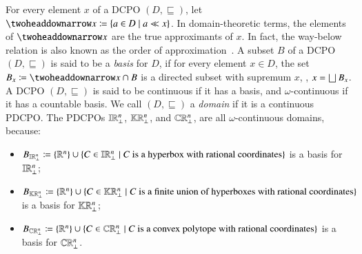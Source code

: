 \documentclass[11pt,times]{article}
\begin{document}
For every element $x$ of a \ac{DCPO} $(D, \sqsubseteq)$, let
$\waybelows{x} \defeq \setbarNormal{a \in D}{a \ll x}$. In
domain-theoretic terms, the elements of $\waybelows{x}$ are the true
approximants of $x$. In fact, the way-below relation is also known as
the order of
approximation~\parencite[Section~2.2.1]{AbramskyJung94-DT}. A subset
$B$ of a \ac{DCPO} $(D, \sqsubseteq)$ is said to be a \emph{basis} for
$D$, if for every element $x \in D$, the set
$B_x \defeq \waybelows{x} \cap B$ is a directed subset with supremum
$x$, {\ie}, $x = \lub B_x$. A \ac{DCPO} $(D, \sqsubseteq)$ is said to
be continuous if it has a basis, and $\omega$-continuous if it has a
countable basis. We call $(D, \sqsubseteq)$ a \emph{domain} if it is a
continuous \ac{PDCPO}. The \acp{PDCPO} $\intvaldom[\R^n\lift]$,
$\kCPPO{\R^n\lift}$, and $\cCPPO{\R^n\lift}$, are all
$\omega$-continuous domains, because:

\label{page:domain}

\begin{itemize}
\item
  $B_{\intvaldom[\R^n\lift]} \defeq \set{\R^n} \cup \setbarNormal{C
    \in \intvaldom[\R^n\lift]}{C \text{ is a hyperbox with
      rational coordinates}}$ is a basis for $\intvaldom[\R^n\lift]$;

\item $B_{\kCPPO{\R^n\lift}} \defeq \set{\R^n} \cup \setbarNormal{C \in
  \kCPPO{\R^n\lift}}{C \text{ is a finite union of hyperboxes with
    rational coordinates}}$ is a basis for $\kCPPO{\R^n\lift}$;

\item
  $B_{\cCPPO{\R^n\lift}} \defeq \set{\R^n} \cup \setbarNormal{C \in
    \cCPPO{\R^n\lift}}{C \text{ is a convex polytope with rational
      coordinates}}$ is a basis for $\cCPPO{\R^n\lift}$.

\end{itemize}
%

\label{page:StoltenbergHansen_Tucker:mentioned}
\end{document}
